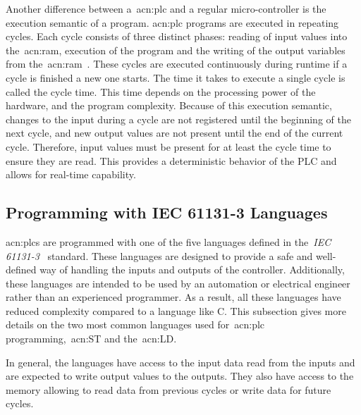 Another difference between a~\acrshort{acn:plc} and a regular micro-controller is the execution semantic of a program.
\acrshort{acn:plc} programs are executed in repeating cycles.
Each cycle consists of three distinct phases: reading of input values into the~\acrshort{acn:ram}, execution of the program and the writing of the output variables from the~\acrshort{acn:ram}~\cite[p.~75]{BOLTON200653}.
These cycles are executed continuously during runtime if a cycle is finished a new one starts.
The time it takes to execute a single cycle is called the cycle time.
This time depends on the processing power of the hardware, and the program complexity.
Because of this execution semantic, changes to the input during a cycle are not registered until the beginning of the next cycle, and new output values are not present until the end of the current cycle.
Therefore, input values must be present for at least the cycle time to ensure they are read.
This provides a deterministic behavior of the PLC and allows for real-time capability.

\subsection{Programming with IEC 61131-3 Languages}

\acrshort{acn:plc}s are programmed with one of the five languages defined in the~\textit{IEC 61131-3}~\cite{Plcopen:61131-3} standard.
These languages are designed to provide a safe and well-defined way of handling the inputs and outputs of the controller.
Additionally, these languages are intended to be used by an automation or electrical engineer rather than an experienced programmer.
As a result, all these languages have reduced complexity compared to a language like C.
This subsection gives more details on the two most common languages used for~\acrshort{acn:plc} programming,~\acrfull{acn:ST} and the~\acrfull{acn:LD}.

In general, the languages have access to the input data read from the inputs and are expected to write output values to the outputs.
They also have access to the memory allowing to read data from previous cycles or write data for future cycles.
\\
